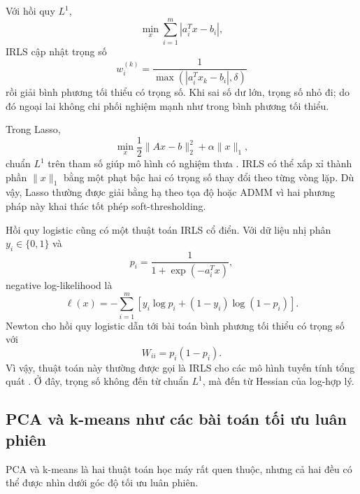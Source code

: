 Với hồi quy $L^1$,
\begin{equation}
    \min_x \sum_{i=1}^{m}|a_i^{T}x-b_i|,
    \label{eq_ml_l1_regression}
\end{equation}
IRLS cập nhật trọng số
\begin{equation}
    w_i^{(k)}=\frac{1}{\max(|a_i^{T}x_k-b_i|,\delta)}
    \label{eq_ml_l1_weight}
\end{equation}
rồi giải bình phương tối thiểu có trọng số. Khi sai số dư lớn, trọng số nhỏ đi; do đó ngoại lai không chi phối nghiệm mạnh như trong bình phương tối thiểu.
\medskip

Trong Lasso,
\begin{equation}
    \min_x
    \frac{1}{2}\|Ax-b\|_2^2+\alpha\|x\|_1,
    \label{eq_ml_lasso}
\end{equation}
chuẩn $L^1$ trên tham số giúp mô hình có nghiệm thưa \cite{Tibshirani1996}. IRLS có thể xấp xỉ thành phần $\|x\|_1$ bằng một phạt bậc hai có trọng số thay đổi theo từng vòng lặp. Dù vậy, Lasso thường được giải bằng hạ theo tọa độ hoặc ADMM vì hai phương pháp này khai thác tốt phép soft-thresholding.
\medskip

Hồi quy logistic cũng có một thuật toán IRLS cổ điển. Với dữ liệu nhị phân $y_i\in\{0,1\}$ và
\begin{equation}
    p_i=\frac{1}{1+\exp(-a_i^{T}x)},
    \label{eq_logistic_probability}
\end{equation}
negative log-likelihood là
\begin{equation}
    \ell(x)
    =
    -\sum_{i=1}^{m}
    \left[y_i\log p_i+(1-y_i)\log(1-p_i)\right].
    \label{eq_logistic_loss}
\end{equation}
Newton cho hồi quy logistic dẫn tới bài toán bình phương tối thiểu có trọng số với
\begin{equation}
    W_{ii}=p_i(1-p_i).
    \label{eq_logistic_weight}
\end{equation}
Vì vậy, thuật toán này thường được gọi là IRLS cho các mô hình tuyến tính tổng quát \cite{Bishop2006}. Ở đây, trọng số không đến từ chuẩn $L^1$, mà đến từ Hessian của log-hợp lý.

\subsection{PCA và k-means như các bài toán tối ưu luân phiên}
\label{SUB_SEC_ml_pca_kmeans}
PCA và k-means là hai thuật toán học máy rất quen thuộc, nhưng cả hai đều có thể được nhìn dưới góc độ tối ưu luân phiên.
\medskip

